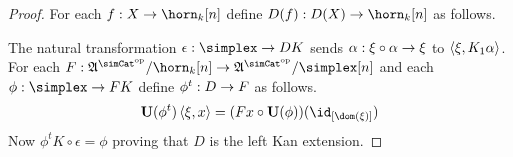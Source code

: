 \documentclass[csh.tex]{subfiles}
\begin{document}
\begin{proof} For each $f\of X\to\horn_k[n]$ define $D(f)\of D(X)\to\horn_k[n]$ as follows.

The natural transformation $\epsilon\of \simplex \to DK$ sends $\alpha: \xi\circ \alpha \to \xi$ to $\left\langle \xi,K_1\alpha \right\rangle$.
For each $F\of \ambient\s/\horn_k[n]\to\ambient\s/\simplex[n]$ and each $\phi\of \simplex\to FK$ define $\phi^t: D\to F$ as follows.
\[ \base(\phi^t)\tuplet{\xi,x} = (Fx\circ\base(\phi))(\id_{[\dom(\xi)]}) \]
Now $\phi^t K\circ \epsilon = \phi$ proving that $D$ is the left Kan extension.
\end{proof}
\end{document}
